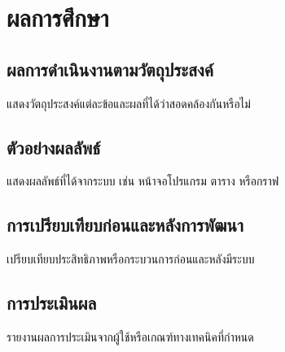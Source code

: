 \chapter{ผลการศึกษา}

\section{ผลการดำเนินงานตามวัตถุประสงค์}

แสดงวัตถุประสงค์แต่ละข้อและผลที่ได้ว่าสอดคล้องกันหรือไม่

\section{ตัวอย่างผลลัพธ์}

แสดงผลลัพธ์ที่ได้จากระบบ เช่น หน้าจอโปรแกรม ตาราง หรือกราฟ

\section{การเปรียบเทียบก่อนและหลังการพัฒนา}

เปรียบเทียบประสิทธิภาพหรือกระบวนการก่อนและหลังมีระบบ

\section{การประเมินผล}

รายงานผลการประเมินจากผู้ใช้หรือเกณฑ์ทางเทคนิคที่กำหนด